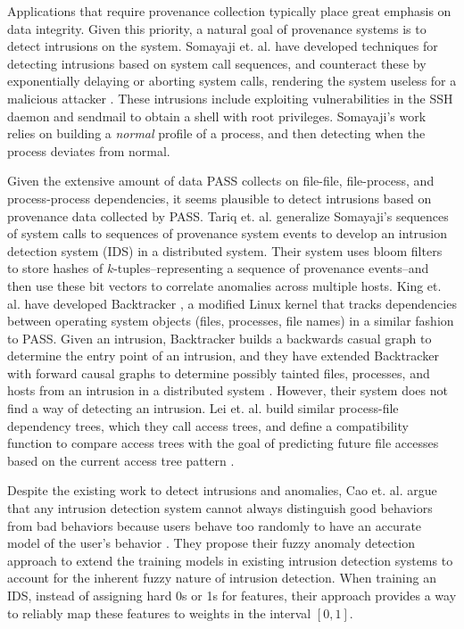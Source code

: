 \documentclass[10pt,twocolumn]{article}
\begin{document}
Applications that require provenance collection typically place great emphasis on data integrity. Given this priority, a natural goal of provenance systems is to detect intrusions on the system. Somayaji et. al. have developed techniques for detecting intrusions based on system call sequences, and counteract these by exponentially delaying or aborting system calls, rendering the system useless for a malicious attacker \cite{somayaji}\cite{somayaji-recent}. These intrusions include exploiting vulnerabilities in the SSH daemon and sendmail to obtain a shell with root privileges. Somayaji's work relies on building a {\em normal} profile of a process, and then detecting when the process deviates from normal.

Given the extensive amount of data PASS collects on file-file, file-process, and process-process dependencies, it seems plausible to detect intrusions based on provenance data collected by PASS. Tariq et. al. generalize Somayaji's sequences of system calls to sequences of provenance system events \cite{correlated-anomalies} to develop an intrusion detection system (IDS) in a distributed system. Their system uses bloom filters to store hashes of $k$-tuples--representing a sequence of provenance events--and then use these bit vectors to correlate anomalies across multiple hosts. King et. al. have developed Backtracker \cite{backtracker}, a modified Linux kernel that tracks dependencies between operating system objects (files, processes, file names) in a similar fashion to PASS. Given an intrusion, Backtracker builds a backwards casual graph to determine the entry point of an intrusion, and they have extended Backtracker with forward causal graphs to determine possibly tainted files, processes, and hosts from an intrusion in a distributed system \cite{multihost}. However, their system does not find a way of detecting an intrusion. Lei et. al. build similar process-file dependency trees, which they call access trees, and define a compatibility function to compare access trees with the goal of predicting future file accesses based on the current access tree pattern \cite{fileprefetch}.

Despite the existing work to detect intrusions and anomalies, Cao et. al. argue that any intrusion detection system cannot always distinguish good behaviors from bad behaviors because users behave too randomly to have an accurate model of the user's behavior \cite{fuzzy}. They propose their fuzzy anomaly detection approach to extend the training models in existing intrusion detection systems to account for the inherent fuzzy nature of intrusion detection. When training an IDS, instead of assigning hard 0s or 1s for features, their approach provides a way to reliably map these features to weights in the interval $[0,1]$. 
\end{document}
